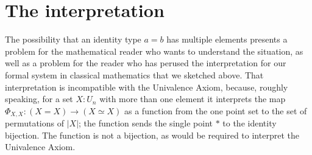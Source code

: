 \documentclass[letter,12pt]{amsart}
\theoremstyle{definition}
\theoremstyle{remark}
\numberwithin{equation}{section}
\newcommand{\weq}{\simeq}
\begin{document}
\section{The interpretation}
\label{the_interpretation}

The possibility that an identity type $a=b$ has multiple elements presents a problem for the mathematical reader who wants to understand the
situation, as well as a problem for the reader who has perused the interpretation for our formal system in classical mathematics that we
sketched above.  That interpretation is incompatible with the Univalence Axiom, because, roughly speaking, for a set $X:U_n$ with more than one
element it interprets the map $ \Phi_{X,X} : (X=X) \to (X \weq X)$ as a function from the one point set to the set of permutations of $|X|$; the
function sends the single point $*$ to the identity bijection.  The function is not a bijection, as would be required to interpret the
Univalence Axiom.
\end{document}
